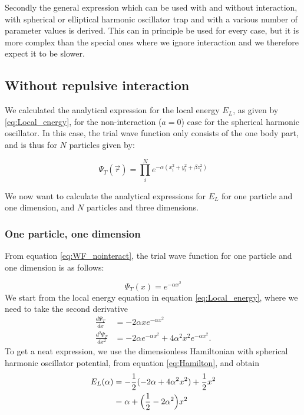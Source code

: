 \documentclass[norsk,a4paper,12pt]{article}
\begin{document}
Secondly the general expression which can be used with and without interaction, with spherical or elliptical harmonic oscillator trap and with a various number of parameter values is derived. This can in principle be used for every case, but it is more complex than the special ones where we ignore interaction and we therefore expect it to be slower. 

\subsection{Without repulsive interaction}
We calculated the analytical expression for the local energy $E_L$, as given by \ref{eq:Local_energy}, for the non-interaction ($a=0$) case for the spherical harmonic oscillator. In this case, the trial wave function only consists of the one body part, and is thus for $N$ particles given by:

\begin{equation}
	\label{eq:WF_nointeract}
	\Psi_T(\vec{r}) = \prod_i^N e^{-\alpha(x_i^2 + y_i^2 + \beta z_i^2)}
\end{equation}

We now want to calculate the analytical expressions for $E_L$ for one particle and one dimension, and $N$ particles and three dimensions.

\subsubsection{One particle, one dimension}

From equation \ref{eq:WF_nointeract}, the trial wave function for one particle and one dimension is as follows:

\begin{equation}
	\label{eq:WF_1dim_1N}
	\Psi_T(x) = e^{-\alpha x^2} 
\end{equation}
We start from the local energy equation in equation \ref{eq:Local_energy}, where we need to take the second derivative
\begin{align}
\frac{d\Psi_T}{dx}&=-2\alpha xe^{-\alpha x^2}\\
\frac{d^2\Psi_T}{dx^2}&=-2\alpha e^{-\alpha x^2}+4\alpha^2x^2e^{-\alpha x^2}.
\end{align}
To get a neat expression, we use the dimensionless Hamiltonian with spherical harmonic oscillator potential, from equation \ref{eq:Hamilton}, and obtain
\begin{align}
E_L(\alpha)&=-\frac{1}{2}(-2\alpha + 4\alpha^2x^2)+\frac{1}{2}x^2\notag\\
&=\alpha+\Big(\frac{1}{2}-2\alpha^2\Big)x^2
\end{align}
\end{document}
